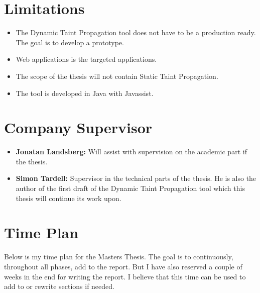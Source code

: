 \documentclass{../kththesis}
\begin{document}
\section{Limitations}
\begin{itemize}  
	\item The Dynamic Taint Propagation tool does not have to be a production ready. The goal is to develop a prototype.
	\item Web applications is the targeted applications.
	\item The scope of the thesis will not contain Static Taint Propagation.
	\item The tool is developed in Java with Javassist.
\end{itemize}


\section{Company Supervisor}
\begin{itemize}
	\item \textbf{Jonatan Landsberg:} Will assist with supervision on the academic part if the thesis.
	\item \textbf{Simon Tardell:} Supervisor in the technical parts of the thesis. He is also the author of the first draft of the Dynamic Taint Propagation tool which this thesis will continue its work upon. 
\end{itemize}


\section{Time Plan}
Below is my time plan for the Masters Thesis. The goal is to continuously, throughout all phases, add to the report. But I have also reserved a couple of weeks in the end for writing the report. I believe that this time can be used to add to or rewrite sections if needed. \\ \\
\end{document}
